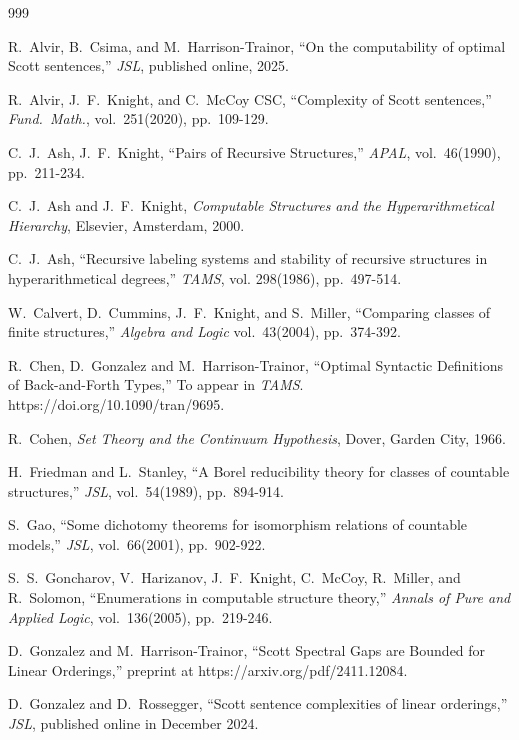 \documentclass{article}
\begin{document}
\begin{thebibliography}{999}

  R.\ Alvir, B.\ Csima, and M.\ Harrison-Trainor, ``On the computability of optimal Scott sentences,'' \emph{JSL}, published online, 2025.  

   R.\ Alvir, J.\ F.\ Knight, and C.\ McCoy CSC, ``Complexity of
Scott sentences,'' \emph{Fund.\ Math.}, vol.\ 251(2020), pp.\ 109-129.

 C.\ J.\ Ash, J.\ F.\ Knight, ``Pairs of Recursive Structures,'' \emph{APAL}, vol.\ 46(1990), pp.\ 211-234.

  C.\ J.\ Ash and J.\ F.\ Knight, \emph{Computable Structures and the Hyperarithmetical Hierarchy}, Elsevier, Amsterdam, 2000.   

 C.\ J.\ Ash, ``Recursive labeling systems and stability of recursive structures in hyperarithmetical degrees,'' \emph{TAMS}, vol. 298(1986), pp.\ 497-514.

  W.\ Calvert, D.\ Cummins, J.\ F.\ Knight, and S.\ Miller, 
``Comparing classes of finite structures,'' \emph{Algebra and Logic} vol.\ 43(2004), pp.\ 374-392.

 R.\ Chen, D.\ Gonzalez and M.\ Harrison-Trainor, ``Optimal Syntactic Definitions of Back-and-Forth Types,'' To appear in \emph{TAMS}. https://doi.org/10.1090/tran/9695.

 R.\ Cohen, \emph{Set Theory and the Continuum Hypothesis}, Dover, Garden City, 1966.  

  H.\ Friedman and L.\ Stanley, ``A Borel reducibility theory for classes of countable structures,'' \emph{JSL}, vol.\ 54(1989), pp.\  894-914.

 S.\ Gao, ``Some dichotomy theorems for isomorphism relations of countable models,'' \emph{JSL}, vol.\ 66(2001), pp.\ 902-922.

  S.\ S.\ Goncharov, V.\ Harizanov, J.\ F.\ Knight, C.\ McCoy, R.\ Miller, and R.\ Solomon, ``Enumerations in computable structure theory,'' \emph{Annals of Pure and Applied Logic}, vol.\ 136(2005), pp.\ 219-246. 

 D.\ Gonzalez and M.\ Harrison-Trainor, ``Scott Spectral Gaps are Bounded for Linear Orderings,'' preprint at https://arxiv.org/pdf/2411.12084. 

  D.\ Gonzalez and D.\ Rossegger, ``Scott sentence complexities of linear orderings,'' \emph{JSL}, published online in December 2024.  


\end{thebibliography}
\end{document}
